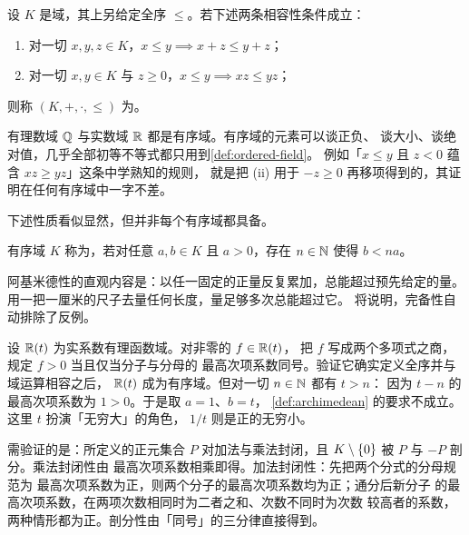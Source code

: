 \begin{definition}[有序域]
  \label{def:ordered-field}
  设 \(K\) 是域，其上另给定全序 \(\le\)。若下述两条相容性条件成立：
  \begin{enumerate}[label=(\roman*)]
    \item 对一切 \(x, y, z \in K\)，\(x \le y \implies x + z \le y + z\)；
    \item 对一切 \(x, y \in K\) 与 \(z \ge 0\)，\(x \le y \implies xz \le yz\)；
  \end{enumerate}
  则称 \((K, +, \cdot, \le)\) 为。
\end{definition}

有理数域 \(\mathbb{Q}\) 与实数域 \(\mathbb{R}\) 都是有序域。有序域的元素可以谈正负、
谈大小、谈绝对值，几乎全部初等不等式都只用到\cref{def:ordered-field}。
例如「\(x \le y\) 且 \(z < 0\) 蕴含 \(xz \ge yz\)」这条中学熟知的规则，
就是把 (ii) 用于 \(-z \ge 0\) 再移项得到的，其证明在任何有序域中一字不差。

下述性质看似显然，但并非每个有序域都具备。

\begin{definition}[阿基米德性]
  \label{def:archimedean}
  有序域 \(K\) 称为，若对任意 \(a, b \in K\)
  且 \(a > 0\)，存在 \(n \in \mathbb{N}\) 使得 \(b < na\)。
\end{definition}

\begin{intuition}
  阿基米德性的直观内容是：以任一固定的正量反复累加，总能超过预先给定的量。
  用一把一厘米的尺子去量任何长度，量足够多次总能超过它。
   将说明，完备性自动排除了反例。
\end{intuition}

\begin{example}
  \label{ex:non-archimedean}
  设 \(\mathbb{R}(t)\) 为实系数有理函数域。对非零的 \(f \in \mathbb{R}(t)\)，
  把 \(f\) 写成两个多项式之商，规定 \(f > 0\) 当且仅当分子与分母的
  最高次项系数同号。验证它确实定义全序并与域运算相容之后，
  \(\mathbb{R}(t)\) 成为有序域。但对一切 \(n \in \mathbb{N}\) 都有 \(t > n\)：
  因为 \(t - n\) 的最高次项系数为 \(1 > 0\)。于是取 \(a = 1\)、\(b = t\)，
  \cref{def:archimedean} 的要求不成立。这里 \(t\) 扮演「无穷大」的角色，
  \(1/t\) 则是正的无穷小。
  \begin{worked}
    需验证的是：所定义的正元集合 \(P\) 对加法与乘法封闭，且
    \(K \setminus \left\{0\right\}\) 被 \(P\) 与 \(-P\) 剖分。乘法封闭性由
    最高次项系数相乘即得。加法封闭性：先把两个分式的分母规范为
    最高次项系数为正，则两个分子的最高次项系数均为正；通分后新分子
    的最高次项系数，在两项次数相同时为二者之和、次数不同时为次数
    较高者的系数，两种情形都为正。剖分性由「同号」的三分律直接得到。
  \end{worked}
\end{example}

